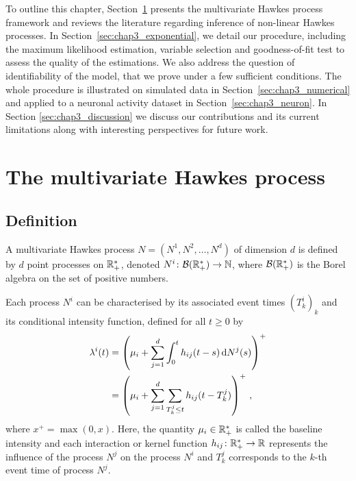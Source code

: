 To outline this chapter, Section~\ref{sec:chap3_presentation} presents the multivariate Hawkes process framework and reviews the literature regarding inference of non-linear Hawkes processes.
In Section~\ref{sec:chap3_exponential}, we detail our procedure, including the maximum likelihood estimation, variable selection and goodness-of-fit test to assess the quality of the estimations. We also address the question of identifiability of the model, that we prove under a few sufficient conditions. 
The whole procedure is illustrated on simulated data in Section~\ref{sec:chap3_numerical} and applied to a neuronal activity dataset in Section~\ref{sec:chap3_neuron}. In Section \ref{sec:chap3_discussion} we discuss our contributions and its current limitations along with interesting perspectives for future work.

\section{The multivariate Hawkes process}\label{sec:chap3_presentation}
    \subsection{Definition}
    A multivariate Hawkes process $N = (N^1, N^2, \ldots, N^d)$ of dimension $d$ is defined by $d$ point processes on ${\mathbb R}_+^*$, denoted $N^i\colon \mathcal B({\mathbb R}_+^*) \to {\mathbb N}$, where $\mathcal{B}({\mathbb R}_+^*)$ is the Borel algebra on the set of positive numbers.

    Each process $N^i$ can be characterised by its associated event times $\left(T_k^i\right)_k$ and its conditional intensity function, defined for all \(t \ge 0\) by
    \begin{align}
    \lambda^i(t) &= \left(\mu_i + \sum_{j=1}^{d}{\int_{0}^{t}{h_{ij}(t-s)\,\mathrm{d}N^j(s)}}\right)^+\nonumber\\ &= \left(\mu_i + \sum_{j=1}^{d}\sum_{T_k^j \leq t}{h_{ij}(t-T^j_k)}\right)^+\label{eq:chap3_dimensional_c_intensity}\,,
    \end{align}
    where
    $x^+ = \max{(0,x)}$.
    Here, the quantity $\mu_i\in{\mathbb R}_+^*$ is called the baseline intensity and each interaction or kernel function $h_{ij}\colon {\mathbb R}_+^* \to {\mathbb R}$ represents the influence of the process $N^j$ on the process $N^i$ and $T^j_k$ corresponds to the $k$-th event time of process $N^j$.

